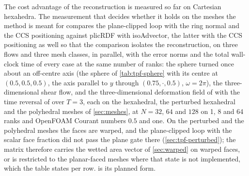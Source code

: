 \documentclass[preprint,12pt]{elsarticle}
\begin{document}
The cost advantage of the reconstruction is measured so far on Cartesian hexahedra. The measurement that decides whether it holds on the meshes the method is meant for compares the plane-clipped loop with the ring normal and the CCS positioning against plicRDF with isoAdvector, the latter with the CCS positioning as well so that the comparison isolates the reconstruction, on three flows and three mesh classes, in parallel, with the error norms and the total wall-clock time of every case at the same number of ranks: the sphere turned once about an off-centre axis (the sphere of \cref{tab:tpf-sphere} with its centre at $(0.5, 0.5, 0.5)$, the axis parallel to $y$ through $(0.75, \cdot, 0.5)$, $\omega = 2\pi$), the three-dimensional shear flow, and the three-dimensional deformation field of \citet{LeVeque1996} with the time reversal of \citet{EnrightEtAl2002} over $T = 3$, each on the hexahedral, the perturbed hexahedral and the polyhedral meshes of \cref{sec:meshes}, at $N = 32$, $64$ and $128$ on 1, 8 and 64 ranks and OpenFOAM Courant numbers $0.5$ and one. On the perturbed and the polyhedral meshes the faces are warped, and the plane-clipped loop with the scalar face fraction did not pass the plane gate there (\cref{sec:tpf-perturbed}); the matrix therefore carries the wetted area vector of \cref{sec:warped} on warped faces, or is restricted to the planar-faced meshes where that state is not implemented, which the table states per row.  is its planned form.
\end{document}
